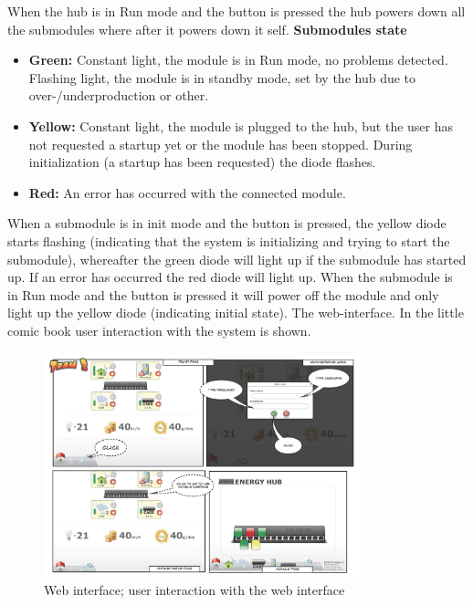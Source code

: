 		When the hub is in Run mode and the button is pressed the hub powers down all the submodules where after it powers down it self.
		\textbf{Submodules state}
		\begin{itemize}
			\item \textbf{Green: }Constant light, the module is in Run mode, no problems detected. Flashing light, the module is in standby mode, set by the hub
							due to over-/underproduction or other.
			\item \textbf{Yellow: }Constant light, the module is plugged to the hub, but the user has not requested a startup yet or the module has been stopped.
							During initialization (a startup has been requested) the diode flashes.
			\item \textbf{Red: }An error has occurred with the connected module.
		\end{itemize}
		When a submodule is in init mode and the button is pressed, the yellow diode starts flashing (indicating that the system is initializing and trying to start the submodule), whereafter
		the green diode will light up if the submodule has started up. If an error has occurred the red diode will light up. 
		When the submodule is in Run mode and the button is pressed it will power off the module and only light up the yellow diode (indicating initial state).
		\newpage
		The web-interface. In the little comic book user interaction with the system is shown.
		\begin{figure}[h!]		%
			\begin{centering}
				 \includegraphics[width=0.82\textwidth]{images/web_interface1.jpg}
				\caption{Web interface; user interaction with the web interface}
		 	\end{centering}
		\end{figure}

